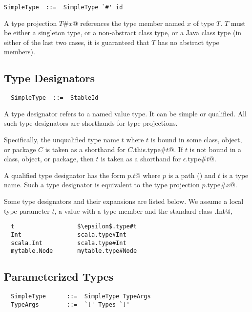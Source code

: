 \documentclass[a4paper,12pt,twoside,titlepage]{book}
\begin{document}
\syntax\begin{lstlisting} 
SimpleType  ::=  SimpleType `#' id
\end{lstlisting}

A type projection \lstinline@$T$#$x$@ references the type member named 
$x$ of type $T$. $T$ must be either a singleton type,
or a non-abstract class type, or a Java class type (in either of the
last two cases, it is guaranteed that $T$ has no abstract type
members).

\subsection{Type Designators}
\label{sec:type-desig}

\syntax\begin{lstlisting}
  SimpleType  ::=  StableId
\end{lstlisting}

A type designator refers to a named value type. It can be simple or
qualified. All such type designators are shorthands for type projections.

Specifically, the unqualified type name $t$ where $t$ is bound in some
class, object, or package $C$ is taken as a shorthand for
\lstinline@$C$.this.type#$t$@.  If $t$ is not bound in a class, object, or
package, then $t$ is taken as a shorthand for
\lstinline@$\epsilon$.type#$t$@.

A qualified type designator has the form \lstinline@$p$.$t$@ where $p$ is
a path (\sref{}) and $t$ is a type name. Such a type designator is
equivalent to the type projection \lstinline@$p$.type#$x$@.

\example 
Some type designators and their expansions are listed below. We assume
a local type parameter $t$, a value 
with a type member  and the standard class \lstinline@scala.Int@, 
\begin{lstlisting}
  t                  $\epsilon$.type#t
  Int                scala.type#Int
  scala.Int          scala.type#Int
  mytable.Node       mytable.type#Node
\end{lstlisting}

\subsection{Parameterized Types}
\label{sec:param-types}

\syntax\begin{lstlisting}
  SimpleType      ::=  SimpleType TypeArgs
  TypeArgs        ::=  `[' Types `]'
\end{lstlisting}
\end{document}
